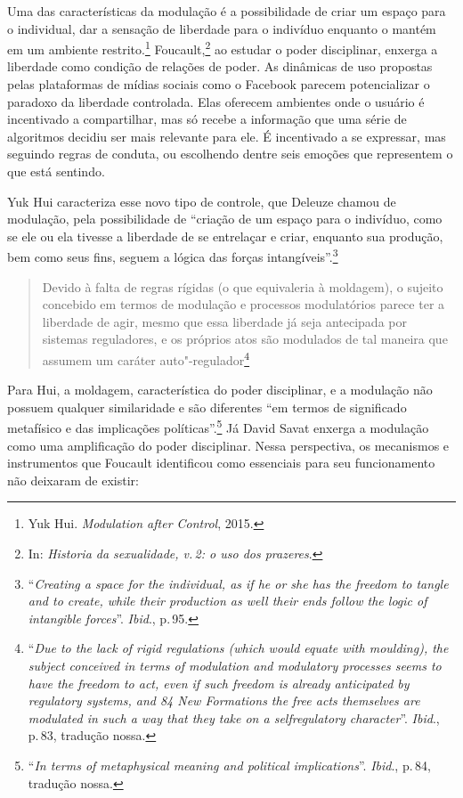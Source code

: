 Uma das características da modulação é a possibilidade de criar um
espaço para o individual, dar a sensação de liberdade para o indivíduo
enquanto o mantém em um ambiente restrito.\footnote{Yuk Hui. \emph{Modulation after Control}, 2015.}
Foucault,\footnote{In: \emph{Historia da sexualidade, v.\,2: o uso dos prazeres}.} ao estudar o poder disciplinar, enxerga a liberdade como condição de
relações de poder. As dinâmicas de uso propostas pelas plataformas de
mídias sociais como o Facebook parecem potencializar o paradoxo da
liberdade controlada. Elas oferecem ambientes onde o usuário é
incentivado a compartilhar, mas só recebe a informação que uma série de
algoritmos decidiu ser mais relevante para ele. É incentivado a se
expressar, mas seguindo regras de conduta, ou escolhendo dentre seis
emoções que representem o que está sentindo.

Yuk Hui caracteriza esse novo tipo de controle, que Deleuze
chamou de modulação, pela possibilidade de ``criação de um espaço
para o indivíduo, como se ele ou ela tivesse a liberdade de se
entrelaçar e criar, enquanto sua produção, bem como seus fins, seguem a
lógica das forças intangíveis''.\footnote{``\emph{Creating a space for the
  individual, as if he or she has the freedom to tangle and to create,
  while their production as well their ends follow the logic of
  intangible forces}''. \textit{Ibid}., p.\,95.}

\begin{quote}
Devido à falta de regras rígidas (o que equivaleria à moldagem), o
sujeito concebido em termos de modulação e processos modulatórios parece
ter a liberdade de agir, mesmo que essa liberdade já seja antecipada por
sistemas reguladores, e os próprios atos são modulados de tal maneira
que assumem um caráter auto"-regulador\footnote{``\emph{Due to the lack of
  rigid regulations (which would equate with moulding), the subject
  conceived in terms of modulation and modulatory processes seems to
  have the freedom to act, even if such freedom is already anticipated
  by regulatory systems, and 84 New Formations the free acts themselves
  are modulated in such a way that they take on a selfregulatory
  character}''. \textit{Ibid}., p.\,83, tradução nossa.}
\end{quote}

Para Hui, a moldagem, característica do poder disciplinar, e a modulação não
possuem qualquer similaridade e são diferentes ``em termos de
significado metafísico e das implicações políticas''.\footnote{``\emph{In terms
  of metaphysical meaning and political implications}''. \textit{Ibid}., p.\,84, tradução
nossa.} Já David Savat enxerga a modulação como uma amplificação do poder disciplinar. Nessa perspectiva, os mecanismos e instrumentos que Foucault identificou como
essenciais para seu funcionamento não deixaram de existir:

